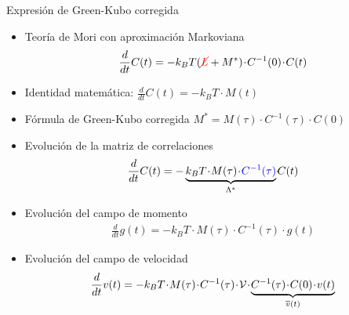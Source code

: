 \documentclass{beamer}
\newcommand{\esc}{\!\cdot\!}
\begin{document}
\begin{frame}{Expresión de Green-Kubo corregida}
  \begin{itemize}
    \item<1-> Teoría de Mori con aproximación Markoviana
      \begin{align}
        \frac{d}{dt}C(t)=-k_BT({\color{red}\cancel{L}} + M^*)\esc C^{-1}(0)\esc C(t)
        \nonumber
      \end{align}
    \item<2-> Identidad matemática:  $\frac{d}{dt}C(t)=-k_B T\esc M(t)$
    \item<3-> Fórmula de Green-Kubo corregida  
       $ M^*=M(\tau)\esc C^{-1}(\tau)\esc C(0)$
    \item<4-> Evolución de la matriz de correlaciones
      \begin{align}
        \frac{d}{dt}C(t)=-\underbrace{k_BT\esc M(\tau)\esc {\color{blue} C^{-1}(\tau)}}_{\Lambda^*}\esc C(t)
        \nonumber
      \end{align}
    \item<5-> Evolución del campo de momento
      \begin{align}
        \frac{d}{dt}g(t)=-k_BT\esc M(\tau)\esc C^{-1}(\tau)\esc g(t)
        \nonumber
      \end{align}
    \item<6-> Evolución del campo de velocidad
      \begin{align}
        \frac{d}{dt}v(t)=-k_BT\esc M(\tau)\esc C^{-1}(\tau)\esc {\cal V}\esc \underbrace{C^{-1}(\tau)\esc C(0)\esc v(t)}_{\overline{v}(t)}
        \nonumber
      \end{align}
  \end{itemize}
\end{frame}
\end{document}
